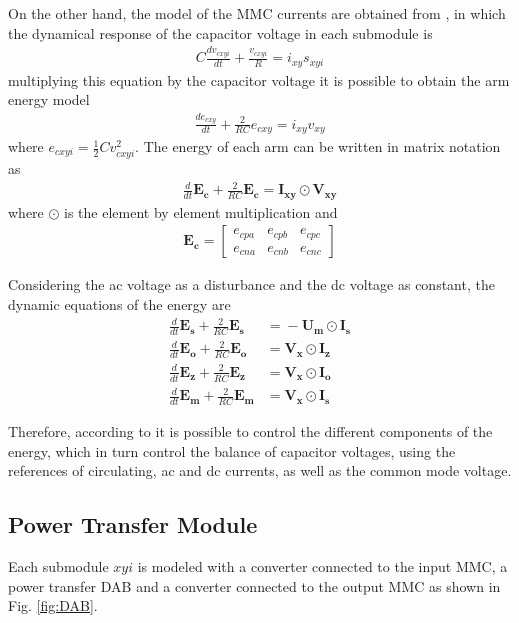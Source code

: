 \documentclass[conference]{IEEEtran}
\begin{document}
On the other hand, the model of the MMC currents are obtained from \cite{7094290}, in which the dynamical response of the capacitor voltage in each submodule is
\begin{align}
C\frac{dv_{cxyi}}{dt}+\frac{v_{cxyi}}{R}=i_{xy}s_{xyi}
\end{align}
multiplying this equation by the capacitor voltage it is possible to obtain the arm energy model
\begin{align}
\frac{d e_{cxy}}{dt}+\frac{2}{RC}e_{cxy}=i_{xy}v_{xy}
\end{align}
where $e_{cxyi}=\frac{1}{2}Cv_{cxyi}^2$. The energy of each arm can be written in matrix notation  as
\begin{align}
\frac{d}{dt}\mathbf{E_{c}}+\frac{2}{RC}\mathbf{E_{c}}=\mathbf{I_{xy}}\odot \mathbf{V_{xy}}
\end{align}
where $\odot$ is the element by element multiplication and
\begin{align}
\mathbf{E_{c}}=
\left[\begin{array}{ccc}e_{cpa}&e_{cpb}&e_{cpc}\\e_{cna}&e_{cnb}&e_{cnc}\end{array}\right]
\end{align}

Considering the ac voltage  as a disturbance and the dc voltage  as constant, the dynamic equations of the energy are
\begin{align}
\frac{d}{dt}\mathbf{E_s}\!+\!\frac{2}{RC}\mathbf{E_s}&=\!-\mathbf{U_m}\odot\mathbf{I_s}\label{eq:Es}\\
\frac{d}{dt}\mathbf{E_o}\!+\!\frac{2}{RC}\mathbf{E_o}&=\!\mathbf{V_x}\odot\mathbf{I_z}\\ 
\frac{d}{dt}\mathbf{E_z}\!+\!\frac{2}{RC}\mathbf{E_z}&=\!\mathbf{V_x}\odot\mathbf{I_o}\\
\frac{d}{dt}\mathbf{E_m}\!+\!\frac{2}{RC}\mathbf{E_m}&=\!\mathbf{V_x}\odot\mathbf{I_s}\label{eq:Em}
\end{align}

Therefore, according to \cite{7094290} it is possible to control the different components of the energy, which in turn control the balance of capacitor voltages, using the references of circulating, ac and dc currents, as well as the common mode voltage. 


\subsection{Power Transfer Module}
Each submodule $xyi$ is modeled with a converter connected to the input MMC, a power transfer DAB and a converter connected to the output MMC as shown in Fig. \ref{fig:DAB}.
\end{document}
